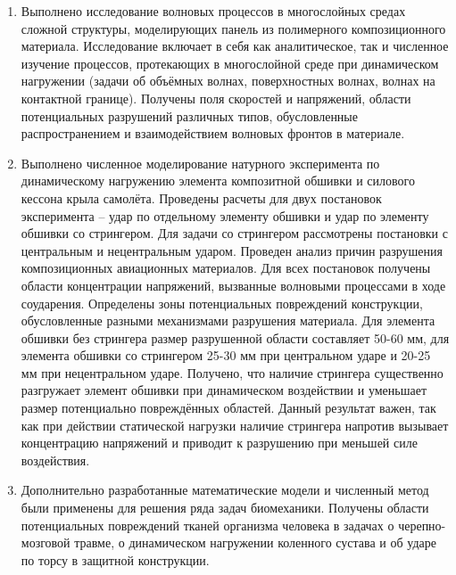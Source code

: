 \begin{enumerate}
\item Выполнено исследование волновых процессов в многослойных средах сложной структуры, моделирующих панель из полимерного композиционного материала. Исследование включает в себя как аналитическое, так и численное изучение процессов, протекающих в многослойной среде при динамическом нагружении (задачи об объёмных волнах, поверхностных волнах, волнах на контактной границе). Получены поля скоростей и напряжений, области потенциальных разрушений различных типов, обусловленные распространением и взаимодействием волновых фронтов в материале.

\item Выполнено численное моделирование натурного эксперимента по динамическому нагружению элемента композитной обшивки и силового кессона крыла самолёта. Проведены расчеты для двух постановок эксперимента -- удар по отдельному элементу обшивки и удар по элементу обшивки со стрингером. Для задачи со стрингером рассмотрены постановки с центральным и нецентральным ударом. Проведен анализ причин разрушения композиционных авиационных материалов. Для всех постановок получены области концентрации напряжений, вызванные волновыми процессами в ходе соударения. Определены зоны потенциальных повреждений конструкции, обусловленные разными механизмами разрушения материала. Для элемента обшивки без стрингера размер разрушенной области составляет 50-60 мм, для элемента обшивки со стрингером 25-30 мм при центральном ударе и 20-25 мм при нецентральном ударе. Получено, что наличие стрингера существенно разгружает элемент обшивки при динамическом воздействии и уменьшает размер потенциально повреждённых областей. Данный результат важен, так как при действии статической нагрузки наличие стрингера напротив вызывает концентрацию напряжений и приводит к разрушению при меньшей силе воздействия.

\item Дополнительно разработанные математические модели и численный метод были применены для решения ряда задач биомеханики. Получены области потенциальных повреждений тканей организма человека в задачах о черепно-мозговой травме, о динамическом нагружении коленного сустава и об ударе по торсу в защитной конструкции.

\end{enumerate}
